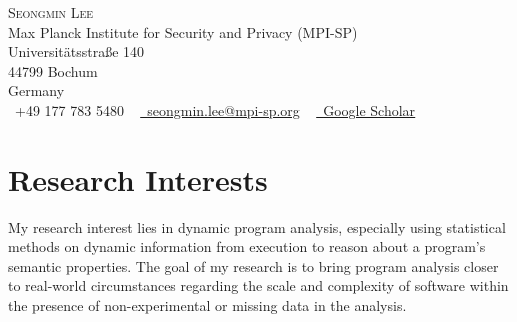 \documentclass[letterpaper,11pt]{article}
\begin{document}



{\Huge \scshape Seongmin Lee} \\ \vspace{10pt}
Max Planck Institute for Security and Privacy (MPI-SP) \\
Universitätsstraße 140 \\
44799 Bochum \\
Germany \\ \vspace{5pt}
\small \raisebox{-0.1\height}\faPhone\ +49 177 783 5480  ~ \href{mailto:seongmin.lee@mpi-sp.org}{\raisebox{-0.2\height}\faEnvelope\  \underline{seongmin.lee@mpi-sp.org}} ~
\href{https://scholar.google.com/citations?user=-YSnc6kAAAAJ&hl=en}{\raisebox{-0.2\height}\faUniversity\ \underline{Google Scholar}}  ~

\section{Research Interests}

My research interest lies in dynamic program analysis, especially using statistical methods on dynamic information from execution to reason about a program's semantic properties.
The goal of my research is to bring program analysis closer to real-world circumstances regarding the scale and complexity of software within the presence of non-experimental or missing data in the analysis.


\end{document}
